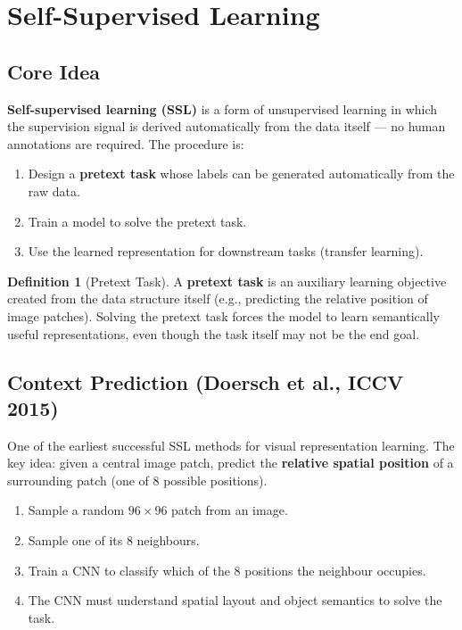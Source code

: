\documentclass[11pt,a4paper]{article}
\theoremstyle{definition}
\newtheorem{definition}{Definition}[section]
\theoremstyle{plain}
\theoremstyle{remark}
\begin{document}
\section{Self-Supervised Learning}

\subsection{Core Idea}

\textbf{Self-supervised learning (SSL)} is a form of unsupervised learning in which the supervision signal is derived automatically from the data itself --- no human annotations are required. The procedure is:

\begin{enumerate}
    \item Design a \textbf{pretext task} whose labels can be generated automatically from the raw data.
    \item Train a model to solve the pretext task.
    \item Use the learned representation for downstream tasks (transfer learning).
\end{enumerate}

\begin{definition}[Pretext Task]
A \textbf{pretext task} is an auxiliary learning objective created from the data structure itself (e.g., predicting the relative position of image patches). Solving the pretext task forces the model to learn semantically useful representations, even though the task itself may not be the end goal.
\end{definition}

\subsection{Context Prediction (Doersch et al., ICCV 2015)}

One of the earliest successful SSL methods for visual representation learning. The key idea: given a central image patch, predict the \textbf{relative spatial position} of a surrounding patch (one of 8 possible positions).

\begin{enumerate}
    \item Sample a random $96\times 96$ patch from an image.
    \item Sample one of its 8 neighbours.
    \item Train a CNN to classify which of the 8 positions the neighbour occupies.
    \item The CNN must understand spatial layout and object semantics to solve the task.
\end{enumerate}
\end{document}
